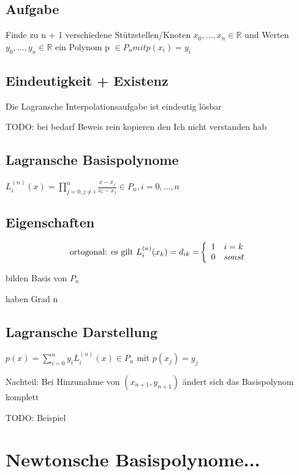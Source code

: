 \documentclass[12pt,a4paper]{article} %
\begin{document}
	\subsection{Aufgabe}
	
	Finde zu n + 1 verschiedene Stützstellen/Knoten $x_0, ..., x_n \in \mathbb{R}$ und Werten $y_0, ..., y_n \in \mathbb{R}$ ein Polynom p $\in P_n mit p(x_i) = y_i$
	
	\subsection{Eindeutigkeit + Existenz}
	
	Die Lagransche Interpolationsaufgabe ist eindeutig lösbar
	
	TODO: bei bedarf Beweis rein kopieren den Ich nicht verstanden hab
	
	\subsection{Lagransche Basispolynome}
	
	$L_i^{(n)}(x) = \prod\limits_{j = 0, j \ne i}^{n} \frac{x - x_j}{x_i - x_j} \in P_n, i = 0, ..., n$
	
	\subsection{Eigenschaften}
	
	\[
		\textnormal{ortogonal: es gilt $L_i^{(n)}(x_k) = d_{ik} =$} \left\{
			\begin{array}{ll}
				1 & i = k \\
				0 & sonst
			\end{array}
		\right.
	\]
	
	bilden Basis von $P_n$
	
	haben Grad n
	
	\subsection{Lagransche Darstellung}
	
	$p(x) = \sum\limits_{i = 0}^{n}y_iL_i^{(n)}(x) \in P_n$ mit $p(x_j) = y_j$
	
	Nachteil: Bei Hinzunahme von $(x_{n+1}, y_{n+1})$ ändert sich das Basispolynom komplett
	
	
	TODO: Beispiel
	
	\newpage
	
	\section{Newtonsche Basispolynome...}
	
\end{document}
